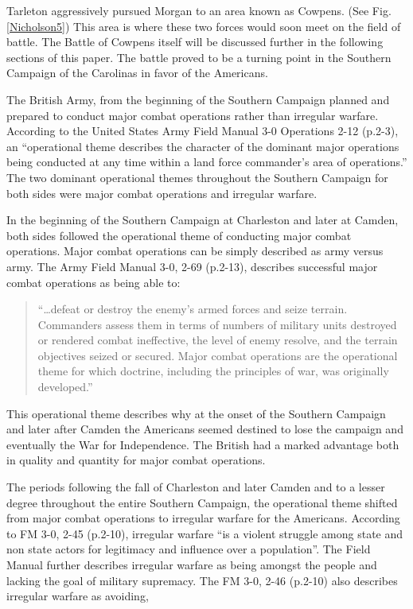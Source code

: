 Tarleton aggressively pursued Morgan to an area known as Cowpens. 
(See Fig. \ref{Nicholson5}) This area is where these two forces would soon meet on the
field of battle.  The Battle of Cowpens itself will be discussed further in the
following sections of this paper.  The battle proved to be a turning point in
the Southern Campaign of the Carolinas in favor of the Americans. 

The British Army, from the beginning of the Southern Campaign planned and
prepared to conduct major combat operations rather than irregular warfare.
According to the United States Army Field Manual 3-0 Operations 2-12 (p.2-3), an
“operational theme describes the character of the dominant major operations
being conducted at any time within a land force commander’s area of operations.”
The two dominant operational themes throughout the Southern Campaign for both
sides were major combat operations and irregular warfare. 

In the beginning of the Southern Campaign at Charleston and later at Camden,
both sides followed the operational theme of conducting major combat operations.
Major combat operations can be simply described as army versus army.  The Army
Field Manual 3-0, 2-69 (p.2-13), describes successful major combat operations as
being able to:

\begin{quote} “…defeat or destroy the enemy’s armed forces and seize terrain.
  Commanders assess them in terms of numbers of military units destroyed or
  rendered combat ineffective, the level of enemy resolve, and the terrain
  objectives seized or secured. Major combat operations are the operational
  theme for which doctrine, including the principles of war, was originally
  developed.” \end{quote}

This operational theme describes why at the onset of the Southern Campaign and
later after Camden the Americans seemed destined to lose the campaign and
eventually the War for Independence.  The British had a marked advantage both in
quality and quantity for major combat operations.

The periods following the fall of Charleston and later Camden and to a lesser
degree throughout the entire Southern Campaign, the operational theme shifted
from major combat operations to irregular warfare for the Americans.  According
to \cite[\S 2-45, pp. 2-10]{fm3-0} FM 3-0, 2-45 (p.2-10), irregular warfare “is a violent struggle among state
and non state actors for legitimacy and influence over a population”.  The Field
Manual further describes irregular warfare as being amongst the people and
lacking the goal of military supremacy.  The FM 3-0, 2-46 (p.2-10) also
describes irregular warfare as avoiding, 

